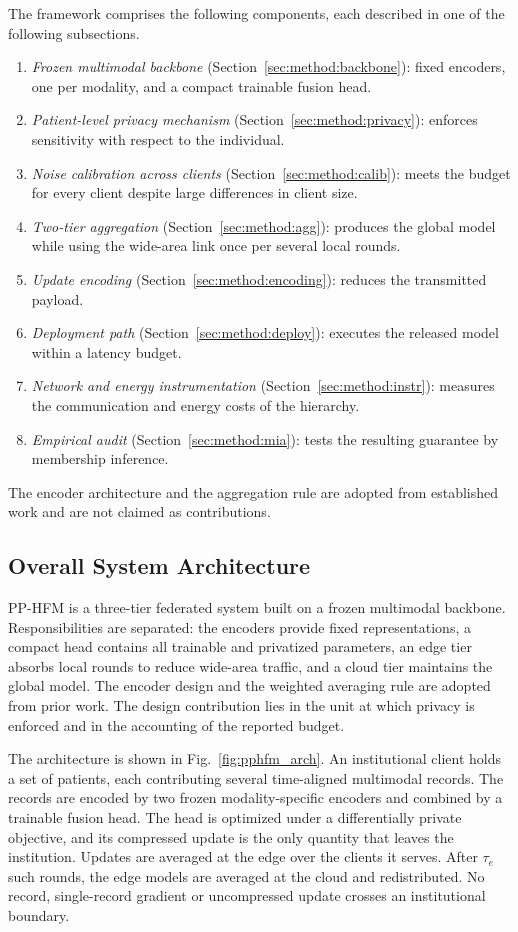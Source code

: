The framework comprises the following components, each described in one of
the following subsections.
\begin{enumerate}
\item \emph{Frozen multimodal backbone} (Section~\ref{sec:method:backbone}):
fixed encoders, one per modality, and a compact trainable fusion head.
\item \emph{Patient-level privacy mechanism}
(Section~\ref{sec:method:privacy}): enforces sensitivity with respect to the
individual.
\item \emph{Noise calibration across clients}
(Section~\ref{sec:method:calib}): meets the budget for every client despite
large differences in client size.
\item \emph{Two-tier aggregation} (Section~\ref{sec:method:agg}): produces
the global model while using the wide-area link once per several local rounds.
\item \emph{Update encoding} (Section~\ref{sec:method:encoding}): reduces the
transmitted payload.
\item \emph{Deployment path} (Section~\ref{sec:method:deploy}): executes the
released model within a latency budget.
\item \emph{Network and energy instrumentation}
(Section~\ref{sec:method:instr}): measures the communication and energy costs
of the hierarchy.
\item \emph{Empirical audit} (Section~\ref{sec:method:mia}): tests the
resulting guarantee by membership inference.
\end{enumerate}
The encoder architecture and the aggregation rule
are adopted from established work and are not claimed
as contributions.

\subsection{Overall System Architecture}
\label{sec:method:arch}

PP-HFM is a three-tier federated system built on a frozen multimodal backbone.
Responsibilities are separated: the encoders provide fixed representations, a
compact head contains all trainable and privatized parameters, an edge tier
absorbs local rounds to reduce wide-area traffic, and a cloud tier maintains
the global model. The encoder design and the weighted averaging rule are
adopted from prior work. The design
contribution lies in the unit at which privacy is enforced and in the
accounting of the reported budget.

The architecture is shown in Fig.~\ref{fig:pphfm_arch}. An institutional
client holds a set of patients, each contributing several time-aligned
multimodal records. The records are encoded by two frozen modality-specific
encoders and combined by a trainable fusion head. The head is optimized under
a differentially private objective, and its compressed update is the only
quantity that leaves the institution. Updates are averaged at the edge over the
clients it serves. After $\tau_e$ such rounds, the edge models are averaged at
the cloud and redistributed. No record, single-record gradient or uncompressed
update crosses an institutional boundary.

